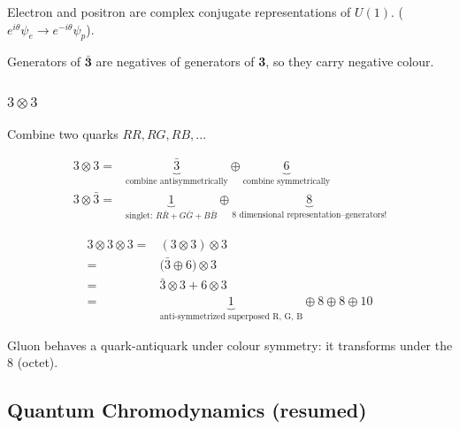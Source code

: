 \documentclass[]{article}
\begin{document}
Electron and positron are complex conjugate representations of $U(1)$. ($e^{i\theta}\psi_e \rightarrow e^{-i\theta}\psi_p$).

Generators of $\bm{\bar{3}}$ are negatives of generators of {\bfseries 3}, so they carry negative colour.

\subsubsection{$3 \otimes 3$}\label{sec:3:3:8}

Combine two quarks ${RR, RG, RB,...}$

\begin{align*}
	3 \otimes 3 =& \underbrace{\bar{3}}_\text{combine antisymmetrically} \oplus \underbrace{6}_\text{combine symmetrically}\\
	3 \otimes \bar{3} =& \underbrace{1}_\text{singlet: $R\bar{R}+G\bar{G}+B\bar{B}$} \oplus \underbrace{8}_\text{8 dimensional representation--generators!}
\end{align*}

\begin{align*}
3 \otimes 3 \otimes 3 =& (3 \otimes 3) \otimes 3\\
=& \big(\bar{3} \oplus 6 \big) \otimes 3\\
=& \bar{3}   \otimes 3 + 6 \otimes 3\\
=& \underbrace{1}_\text{anti-symmetrized superposed R, G, B} \oplus 8 \oplus 8 \oplus 10
\end{align*}

Gluon behaves a quark-antiquark under colour symmetry: it transforms under the 8 (octet).

\subsection{Quantum Chromodynamics (resumed)}
\end{document}
